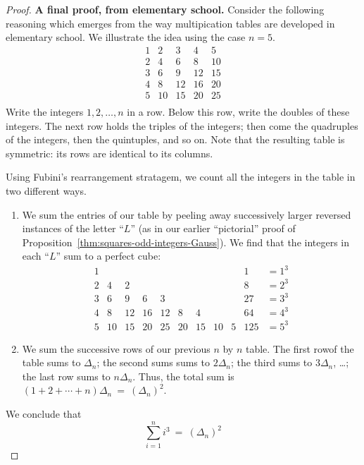 \begin{proof}
{\bf A final proof, from elementary school.}
%
Consider the following reasoning which emerges from the way
multipication tables are developed in elementary school.  We
illustrate the idea using the case $n=5$.
\[
\begin{array}{rrrrr}
1  &  2 &  3 &  4 &  5 \\
2  &  4 &  6 &  8 & 10 \\
3  &  6 &  9 & 12 & 15 \\
4  &  8 & 12 & 16 & 20 \\
5  & 10 & 15 & 20 & 25 \\
\end{array}
\]
Write the integers $1, 2, \ldots, n$ in a row.  Below this row, write
the doubles of these integers.  The next row holds the triples of the
integers; then come the quadruples of the integers, then the
quintuples, and so on.  Note that the resulting table is symmetric:
its rows are identical to its columns.

Using Fubini's rearrangement stratagem, we count all the integers in
the table in two different ways.
\begin{enumerate}
\item
We sum the entries of our table by peeling away successively larger
reversed instances of the letter ``$L$'' (as in our earlier
``pictorial'' proof of
Proposition~\ref{thm:squares-odd-integers-Gauss}).  We find that the
integers in each ``$L$'' sum to a perfect cube:
\[
\begin{array}{ccccccccc|cl}
1  &    &    &    &    &   &     &    &   & 1   & = 1^3 \\
2  &  4 &  2 &    &    &   &     &    &   & 8   & = 2^3 \\
3  &  6 &  9 &  6 &  3 &   &     &    &   & 27  & = 3^3 \\
4  &  8 & 12 & 16 & 12 &  8 &  4 &    &   & 64  & = 4^3 \\
5  & 10 & 15 & 20 & 25 & 20 & 15 & 10 & 5 & 125 & = 5^3
\end{array}
\]

\item
We sum the successive rows of our previous $n$ by $n$ table.  The first rowof the table
sums to $\Delta_n$; the second sums sums to $2 \Delta_n$; the third
sums to $3 \Delta_n$, \ldots; the last row sums to $n \Delta_n$.
Thus, the total sum is $(1 + 2 + \cdots + n) \Delta_n \ =
\ \left(\Delta_n \right)^2$.
\end{enumerate}
We conclude that
\[
\sum_{i=1}^n i^3 \ = \  \left(\Delta_n \right)^2
\]
\end{proof}

